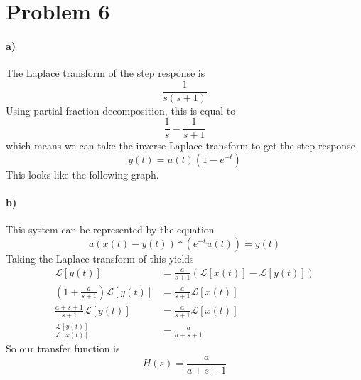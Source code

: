 \documentclass[12pt]{article}
\begin{document}
\section*{Problem 6}

\paragraph{a)}

The Laplace transform of the step response is
\[\frac{1}{s(s+1)}\]
Using partial fraction decomposition, this is equal to
\[\frac{1}{s}-\frac{1}{s+1}\]
which means we can take the inverse Laplace transform to get the step response
\[y(t)=u(t)(1-e^{-t})\]
This looks like the following graph.
\begin{center}
\end{center}

\paragraph{b)}

This system can be represented by the equation
\[a(x(t)-y(t))*(e^{-t}u(t))=y(t)\]
Taking the Laplace transform of this yields
\begin{align*}
    \mathcal{L}[y(t)]&=\frac{a}{s+1}(\mathcal{L}[x(t)]-\mathcal{L}[y(t)])\\
    \left(1+\frac{a}{s+1}\right)\mathcal{L}[y(t)]&=\frac{a}{s+1}\mathcal{L}[x(t)]\\
    \frac{a+s+1}{s+1}\mathcal{L}[y(t)]&=\frac{a}{s+1}\mathcal{L}[x(t)]\\
    \frac{\mathcal{L}[y(t)]}{\mathcal{L}[x(t)]}&=\frac{a}{a+s+1}
\end{align*}
So our transfer function is
\[H(s)=\frac{a}{a+s+1}\]
\end{document}
